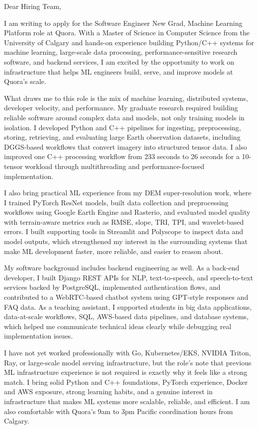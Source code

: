 \documentclass[11pt]{letter}
\begin{document}
\begin{letter}{}

\opening{Dear Hiring Team,}

I am writing to apply for the Software Engineer New Grad, Machine Learning Platform role at Quora. With a Master of Science in Computer Science from the University of Calgary and hands-on experience building Python/C++ systems for machine learning, large-scale data processing, performance-sensitive research software, and backend services, I am excited by the opportunity to work on infrastructure that helps ML engineers build, serve, and improve models at Quora's scale.

What draws me to this role is the mix of machine learning, distributed systems, developer velocity, and performance. My graduate research required building reliable software around complex data and models, not only training models in isolation. I developed Python and C++ pipelines for ingesting, preprocessing, storing, retrieving, and evaluating large Earth observation datasets, including DGGS-based workflows that convert imagery into structured tensor data. I also improved one C++ processing workflow from 233 seconds to 26 seconds for a 10-tensor workload through multithreading and performance-focused implementation.

I also bring practical ML experience from my DEM super-resolution work, where I trained PyTorch ResNet models, built data collection and preprocessing workflows using Google Earth Engine and Rasterio, and evaluated model quality with terrain-aware metrics such as RMSE, slope, TRI, TPI, and wavelet-based errors. I built supporting tools in Streamlit and Polyscope to inspect data and model outputs, which strengthened my interest in the surrounding systems that make ML development faster, more reliable, and easier to reason about.

My software background includes backend engineering as well. As a back-end developer, I built Django REST APIs for NLP, text-to-speech, and speech-to-text services backed by PostgreSQL, implemented authentication flows, and contributed to a WebRTC-based chatbot system using GPT-style responses and FAQ data. As a teaching assistant, I supported students in big data applications, data-at-scale workflows, SQL, AWS-based data pipelines, and database systems, which helped me communicate technical ideas clearly while debugging real implementation issues.

I have not yet worked professionally with Go, Kubernetes/EKS, NVIDIA Triton, Ray, or large-scale model serving infrastructure, but the role's note that previous ML infrastructure experience is not required is exactly why it feels like a strong match. I bring solid Python and C++ foundations, PyTorch experience, Docker and AWS exposure, strong learning habits, and a genuine interest in infrastructure that makes ML systems more scalable, reliable, and efficient. I am also comfortable with Quora's 9am to 3pm Pacific coordination hours from Calgary.


\end{letter}
\end{document}
